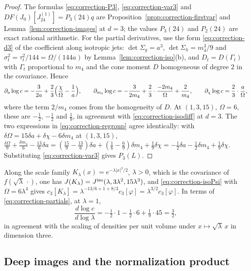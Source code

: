 \begin{proof}
The formulas \eqref{eq:correction-P3}, \eqref{eq:correction-var3} and $DF(J_0)[J^{(1)}_{24}]=P_3(24)q$ are Proposition~\ref{prop:correction-firstvar} and Lemma~\ref{lem:correction-images} at $d=3$; the values $P_3(24)$ and $P_2(24)$ are exact rational arithmetic. For the partial derivatives, use the form \eqref{eq:correction-d3} of the coefficient along isotropic jets: $\det\Sigma_g=a^3$, $\det\Sigma_h=m_4^3/9$ and $\sigma_t^2=\tau_t^2/144=\Omega/(144a)$ by Lemma~\ref{lem:correction-iso}(b), and $D_t=D(\Gamma_t)$ with $\Gamma_t$ proportional to $m_4$ and the cone moment $D$ homogeneous of degree $2$ in the covariance. Hence
\[
\partial_a\log c=-\frac3{2a}+\frac23\Bigl(\frac\chi\Omega-\frac1a\Bigr),\qquad
\partial_{m_4}\log c=-\frac3{2m_4}+\frac23\cdot\frac{-2m_4}\Omega+\frac2{m_4},\qquad
\partial_\chi\log c=\frac23\cdot\frac a\Omega ,
\]
where the term $2/m_4$ comes from the homogeneity of $D$. At $(1,3,15)$, $\Omega=6$, these are $-\frac12$, $-\frac12$ and $\frac19$, in agreement with \eqref{eq:correction-isodiff} at $d=3$. The two expressions in \eqref{eq:correction-regroup} agree identically: with $\delta\Omega=15\delta a+\delta\chi-6\delta m_4$ at $(1,3,15)$, $\frac{\delta\Omega}9+\frac{\delta m_4}6-\frac{13}6\delta a=(\frac{15}9-\frac{13}6)\delta a+(\frac16-\frac69)\delta m_4+\frac19\delta\chi=-\frac12\delta a-\frac12\delta m_4+\frac19\delta\chi$. Substituting \eqref{eq:correction-var3} gives $P_3(L)$.
\end{proof}

\begin{remark}\label{rem:correction-scale}
Along the scale family $K_\lambda(x)=e^{-\lambda|x|^2/2}$, $\lambda>0$, which is the covariance of $f(\sqrt\lambda\,\cdot)$, one has $J(K_\lambda)=J^{\rm iso}(\lambda,3\lambda^2,15\lambda^3)$, and \eqref{eq:correction-isoPsi} with $\Omega=6\lambda^4$ gives $c_3[K_\lambda]=\lambda^{-13/6+1+8/3}c_3[\varphi]=\lambda^{3/2}c_3[\varphi]$. In terms of \eqref{eq:correction-partials}, at $\lambda=1$,
\[
\frac{d\log c}{d\log\lambda}=-\tfrac12\cdot1-\tfrac12\cdot6+\tfrac19\cdot45=\tfrac32 ,
\]
in agreement with the scaling of densities per unit volume under $x\mapsto\sqrt\lambda\,x$ in dimension three.
\end{remark}

\subsection{Deep images and the normalization product}

